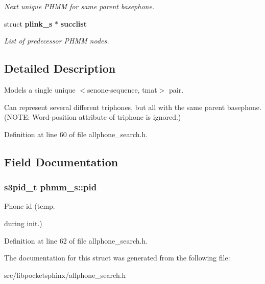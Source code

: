 \begin{DoxyCompactItemize}
\begin{DoxyCompactList}\small\item\em Next unique P\-H\-M\-M for same parent basephone. \end{DoxyCompactList}\item 
struct {\bf plink\-\_\-s} $\ast$ {\bf succlist}\label{structphmm__s_a152d26f99b39098c8027cd2d8372e05c}

\begin{DoxyCompactList}\small\item\em List of predecessor P\-H\-M\-M nodes. \end{DoxyCompactList}\end{DoxyCompactItemize}


\subsection{Detailed Description}
Models a single unique $<$senone-\/sequence, tmat$>$ pair. 

Can represent several different triphones, but all with the same parent basephone. (N\-O\-T\-E\-: Word-\/position attribute of triphone is ignored.) 

Definition at line 60 of file allphone\-\_\-search.\-h.



\subsection{Field Documentation}
\subsubsection[{pid}]{\setlength{\rightskip}{0pt plus 5cm}s3pid\-\_\-t phmm\-\_\-s\-::pid}\label{structphmm__s_aee52956004053c676230cd8567366b60}


Phone id (temp. 

during init.) 

Definition at line 62 of file allphone\-\_\-search.\-h.



The documentation for this struct was generated from the following file\-:\begin{DoxyCompactItemize}
\item 
src/libpocketsphinx/allphone\-\_\-search.\-h\end{DoxyCompactItemize}
